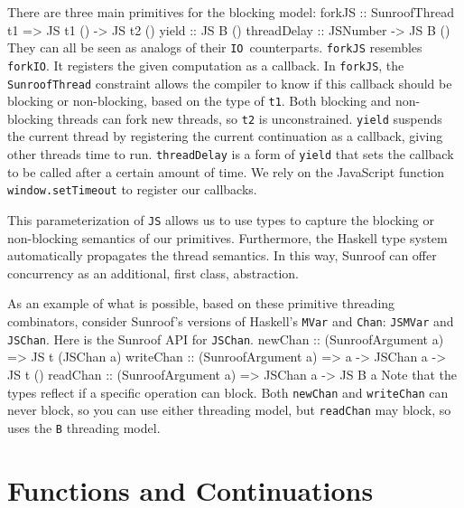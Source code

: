 \documentclass{llncs}
\newcommand{\Src}[1]{{\tt{#1}}}
\newcommand{\IO}{\Src{IO}}
\newenvironment{Code}{\verbatim}{\endverbatim}
\begin{document}
There are three main primitives for the blocking model:
\begin{Code}
forkJS      :: SunroofThread t1 => JS t1 () -> JS t2 ()
yield       :: JS B ()
threadDelay :: JSNumber -> JS B ()
\end{Code}
They can all be seen as analogs of their \IO~counterparts.
\Src{forkJS} resembles \Src{forkIO}.
It registers the given computation as a callback. 
In \Src{forkJS}, the \Src{SunroofThread} constraint allows the compiler
to know if this callback should be blocking or non-blocking,
based on the type of \Src{t1}. Both blocking and non-blocking
threads can fork new threads, so \Src{t2} is unconstrained.
\Src{yield} suspends the current thread by 
registering the current continuation as a callback,
giving other threads time to run.
\Src{threadDelay} is a form of \Src{yield} that sets 
the callback to be called after a certain amount of time.
We rely on the JavaScript function \Src{window.setTimeout} 
\cite{whatwg:timers} to register our callbacks.

This parameterization of \Src{JS} allows us to use types to capture
the blocking or non-blocking semantics of our primitives.
Furthermore, the Haskell type system automatically propagates
the thread semantics. In this way, Sunroof can offer concurrency
as an additional, first class, abstraction.

As an example of what is possible, based on these primitive
threading combinators, consider Sunroof's
versions of Haskell's \Src{MVar} and \Src{Chan}: \Src{JSMVar} and \Src{JSChan}.
Here is the Sunroof API for \Src{JSChan}.
\begin{Code}
newChan   :: (SunroofArgument a) => JS t (JSChan a)
writeChan :: (SunroofArgument a) => a -> JSChan a -> JS t ()
readChan  :: (SunroofArgument a) => JSChan a -> JS B a
\end{Code}
Note that the types reflect if a specific operation can block.
Both \Src{newChan} and \Src{writeChan} can never block, so you can use either threading model,
but \Src{readChan} may block, so uses the \Src{B} threading model.


\section{Functions and Continuations}
\label{sec:functions-continuations}
\end{document}
